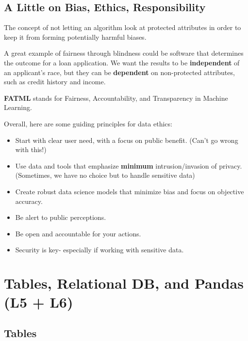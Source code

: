 \documentclass[english, 10pt]{article}
\begin{document}
\subsection{A Little on Bias, Ethics, Responsibility}

\begin{tcolorbox}[title=Aside: Fairness Through Blindness,colframe=black,colback=white,arc=0pt,fonttitle=\bfseries]
The concept of not letting an algorithm look at protected attributes in order to keep it from forming potentially harmful biases.
\end{tcolorbox}

\hfill \break A great example of fairness through blindness could be software that determines the outcome for a loan application. We want the results to be \textbf{independent} of an applicant's race, but they can be \textbf{dependent} on non-protected attributes, such as credit history and income.\\

\begin{tcolorbox}[title=Aside: FATML,colframe=black,colback=white,arc=0pt,fonttitle=\bfseries]
\textbf{FATML} stands for Fairness, Accountability, and Transparency in Machine Learning.
\end{tcolorbox}

\hfill \break Overall, here are some guiding principles for data ethics:

\begin{itemize}
	\item Start with clear user need, with a focus on public benefit. (Can't go wrong with this!)
	\item Use data and tools that emphasize \textbf{minimum} intrusion/invasion of privacy. (Sometimes, we have no choice but to handle sensitive data)
	\item Create robust data science models that minimize bias and focus on objective accuracy.
	\item Be alert to public perceptions.
	\item Be open and accountable for your actions.
	\item Security is key- especially if working with sensitive data.
\end{itemize}

\section{Tables, Relational DB, and Pandas (L5 + L6)}

\subsection{Tables}
\end{document}
